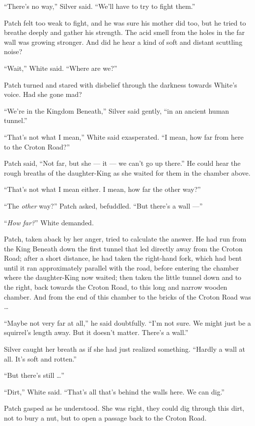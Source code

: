 \documentclass[ebook,oneside,openany,17pt]{memoir}
\begin{document}
“There’s no way,” Silver said. “We’ll have to try to fight them.”

Patch felt too weak to fight, and he was sure his mother did too, but
he tried to breathe deeply and gather his strength. The acid smell
from the holes in the far wall was growing stronger. And did he hear a
kind of soft and distant scuttling noise?

“Wait,” White said. “Where are we?”

Patch turned and stared with disbelief through the darkness towards
White’s voice. Had she gone mad?

“We’re in the Kingdom Beneath,” Silver said gently, “in an ancient
human tunnel.”

“That’s not what I mean,” White said exasperated. “I mean, how far
from here to the Croton Road?”

Patch said, “Not far, but she — it — we can’t go up there.” He could
hear the rough breaths of the daughter-King as she waited for them in
the chamber above.

“That’s not what I mean either. I mean, how far the other way?”

“The \emph{other} way?” Patch asked, befuddled. “But there’s a wall
—”

“\emph{How far?}” White demanded.

Patch, taken aback by her anger, tried to calculate the answer. He had
run from the King Beneath down the first tunnel that led directly away
from the Croton Road; after a short distance, he had taken the
right-hand fork, which had bent until it ran approximately parallel
with the road, before entering the chamber where the daughter-King now
waited; then taken the little tunnel down and to the right, back
towards the Croton Road, to this long and narrow wooden chamber. And
from the end of this chamber to the bricks of the Croton Road was …

“Maybe not very far at all,” he said doubtfully. “I’m not sure. We
might just be a squirrel’s length away. But it doesn’t matter. There’s
a wall.”

Silver caught her breath as if she had just realized
something. “Hardly a wall at all. It’s soft and rotten.”

“But there’s still …”

“Dirt,” White said. “That’s all that’s behind the walls here. We can
dig.”

Patch gasped as he understood. She was right, they could dig through
this dirt, not to bury a nut, but to open a passage back to the Croton
Road.
\end{document}
